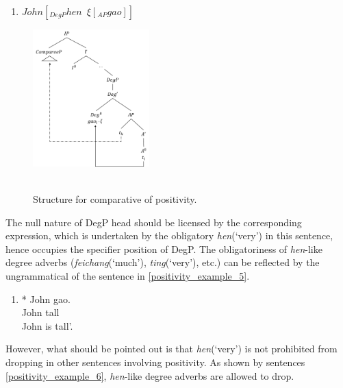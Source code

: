 \documentclass{ctexart}
\begin{document}
\begin{enumerate}
    \item $John [_{DegP} hen \enspace \xi [_{AP} gao]]$
\end{enumerate}

\begin{figure}[H]
    \centering
    \includegraphics[width=0.4\textwidth]{pic/positive_structure.png}
    \begin{caption}
        \\ \vspace{-1.1ex}
        Structure for comparative of positivity.
    \end{caption}
\end{figure}

The null nature of DegP head should be licensed by the corresponding expression, which is undertaken by the obligatory \textit{hen}(`very') in this sentence, hence occupies the specifier position of DegP. The obligatoriness of \textit{hen}-like degree adverbs (\textit{feichang}(`much'), \textit{ting}(`very'), etc.) can be reflected by the ungrammatical of the sentence in \ref{positivity_example_5}.

\begin{enumerate}
    \item \label{positivity_example_5}
    * John gao.  \\
    \hspace*{0.5em} John tall \\
    \hspace*{0.5em} John is tall'.
\end{enumerate}

However, what should be pointed out is that \textit{hen}(`very') is not prohibited from dropping in other sentences involving positivity. As shown by sentences \ref{positivity_example_6}, \textit{hen}-like degree adverbs are allowed to drop.
\end{document}
